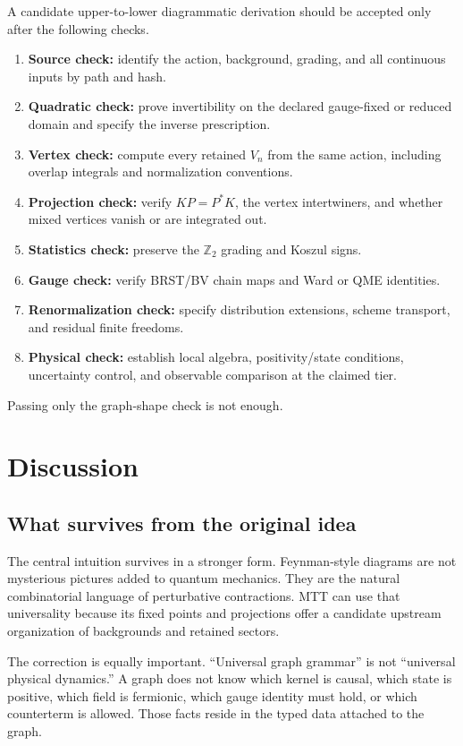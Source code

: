 \documentclass[11pt,a4paper]{article}
\begin{document}
A candidate upper-to-lower diagrammatic derivation should be accepted only
after the following checks.
\begin{enumerate}
\item \textbf{Source check:} identify the action, background, grading, and
all continuous inputs by path and hash.
\item \textbf{Quadratic check:} prove invertibility on the declared
gauge-fixed or reduced domain and specify the inverse prescription.
\item \textbf{Vertex check:} compute every retained \(V_n\) from the same
action, including overlap integrals and normalization conventions.
\item \textbf{Projection check:} verify \(KP=P^*K\), the vertex
intertwiners, and whether mixed vertices vanish or are integrated out.
\item \textbf{Statistics check:} preserve the \(\mathbb Z_2\) grading and
Koszul signs.
\item \textbf{Gauge check:} verify BRST/BV chain maps and Ward or QME
identities.
\item \textbf{Renormalization check:} specify distribution extensions,
scheme transport, and residual finite freedoms.
\item \textbf{Physical check:} establish local algebra, positivity/state
conditions, uncertainty control, and observable comparison at the claimed
tier.
\end{enumerate}
Passing only the graph-shape check is not enough.

\section{Discussion}

\subsection{What survives from the original idea}

The central intuition survives in a stronger form.  Feynman-style diagrams
are not mysterious pictures added to quantum mechanics.  They are the
natural combinatorial language of perturbative contractions.  MTT can use
that universality because its fixed points and projections offer a
candidate upstream organization of backgrounds and retained sectors.

The correction is equally important.  ``Universal graph grammar'' is not
``universal physical dynamics.''  A graph does not know which kernel is
causal, which state is positive, which field is fermionic, which gauge
identity must hold, or which counterterm is allowed.  Those facts reside
in the typed data attached to the graph.
\end{document}
